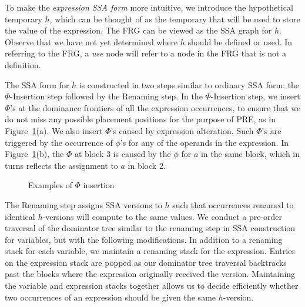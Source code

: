 To make the \emph{expression SSA form} more intuitive, we introduce the hypothetical temporary $h$, which can be thought of as the temporary that will be used to store the value of the expression.
The FRG can be viewed as the SSA graph for $h$.
Observe that we have not yet determined where $h$ should be defined or used. 
In referring to the FRG, a \emph{use} node will refer to a node in the FRG that is not a definition.

The SSA form for $h$ is constructed in two steps similar to ordinary SSA form: 
the $\Phi$-Insertion step followed by the Renaming step. 
In the $\Phi$-Insertion step, we insert $\Phi$'s at the dominance frontiers of all the expression occurrences, to ensure that we do not miss any possible placement positions for the purpose of PRE, as in Figure~\ref{fig:phi-insertion}(a). 
We also insert $\Phi$'s caused by expression alteration. 
Such $\Phi$'s are triggered by the occurrence of $\phi$'s for any of the operands in the expression. 
In Figure~\ref{fig:phi-insertion}(b), the $\Phi$ at block 3 is caused by the $\phi$ for $a$ in the same block, which in turns reflects the assignment to $a$ in block 2.

\begin{figure}
\centering
\caption{Examples of $\Phi$ insertion}
\label{fig:phi-insertion}
\end{figure}

The Renaming step assigns SSA versions to $h$ such that occurrences
renamed to identical $h$-versions will compute to the same values.
We conduct a pre-order traversal of the dominator tree similar to the renaming
step in SSA construction for variables, but with the following modifications.
In addition to a renaming stack for each variable, we
maintain a renaming stack for the expression. Entries on the expression
stack are popped as our dominator tree traversal backtracks past the
blocks where the expression originally received the version.  
Maintaining the variable and expression stacks
together allows us to decide efficiently whether two occurrences of an
expression should be given the same $h$-version.

